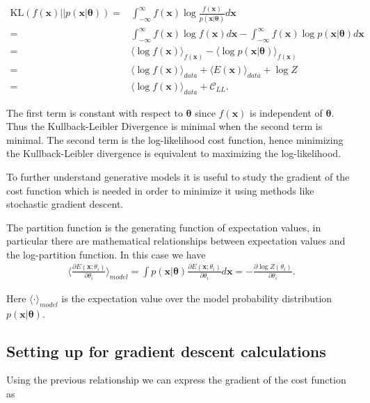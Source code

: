\documentclass[%
oneside,                 %
final,                   %
10pt]{article}
\begin{document}
\begin{align}
	\text{KL} (f(\bm{x})|| p(\bm{x}| \bm{\theta})) =& \int_{-\infty}^{\infty}
	f (\bm{x}) \log \frac{f(\bm{x})}{p(\bm{x}| \bm{\theta})} d\bm{x} \\
	=& \int_{-\infty}^{\infty} f(\bm{x}) \log f(\bm{x}) d\bm{x} - \int_{-\infty}^{\infty} f(\bm{x}) \log
	p(\bm{x}| \bm{\theta}) d\bm{x} \\
	=& \langle \log f(\bm{x}) \rangle_{f(\bm{x})} - \langle \log p(\bm{x}| \bm{\theta}) \rangle_{f(\bm{x})} \\
	=& \langle \log f(\bm{x}) \rangle_{data} + \langle E(\bm{x}) \rangle_{data} + \log Z \\
	=& \langle \log f(\bm{x}) \rangle_{data} + \mathcal{C}_{LL} .
\end{align}

The first term is constant with respect to $\bm{\theta}$ since $f(\bm{x})$ is independent of $\bm{\theta}$. Thus the Kullback-Leibler Divergence is minimal when the second term is minimal. The second term is the log-likelihood cost function, hence minimizing the Kullback-Leibler divergence is equivalent to maximizing the log-likelihood.

To further understand generative models it is useful to study the
gradient of the cost function which is needed in order to minimize it
using methods like stochastic gradient descent. 

The partition function is the generating function of
expectation values, in particular there are mathematical relationships
between expectation values and the log-partition function. In this
case we have
\begin{align}
	\langle \frac{ \partial E(\bm{x}; \theta_i) } { \partial \theta_i} \rangle_{model}
	= \int p(\bm{x}| \bm{\theta}) \frac{ \partial E(\bm{x}; \theta_i) } { \partial \theta_i} d\bm{x} 
	= -\frac{\partial \log Z(\theta_i)}{ \partial  \theta_i} .
\end{align}

Here $\langle \cdot \rangle_{model}$ is the expectation value over the model probability distribution $p(\bm{x}| \bm{\theta})$.

\subsection*{Setting up for gradient descent calculations}

Using the previous relationship we can express the gradient of the cost function as
\end{document}
